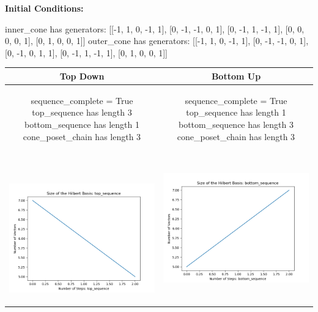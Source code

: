 \documentclass[10pt]{article}
\begin{document}
\textbf{Initial Conditions:}
\begin{SAGE}
inner_cone has generators: 
[[-1, 1, 0, -1, 1], [0, -1, -1, 0, 1], [0, -1, 1, -1, 1], [0, 0, 0, 0, 1], [0, 1, 0, 0, 1]]
outer_cone has generators: 
[[-1, 1, 0, -1, 1], [0, -1, -1, 0, 1], [0, -1, 0, 1, 1], [0, -1, 1, -1, 1], [0, 1, 0, 0, 1]]

\end{SAGE}
\begin{tabular}{c|c}
\textbf{Top Down} & \textbf{Bottom Up} \\ \hline  
\begin{SAGE}
	sequence_complete = True
	top_sequence has length 3
	bottom_sequence has length 1
	cone_poset_chain has length 3
\end{SAGE} 
&
\begin{SAGE}
	sequence_complete = True
	top_sequence has length 1
	bottom_sequence has length 3
	cone_poset_chain has length 3
\end{SAGE} 
\\ \hline
\
\begin{minipage}{.45\textwidth}
\includegraphics[width=\textwidth]{"DATA/5d/5 generators 1 bound E/top_sequence SIZE"}
\end{minipage} &
\begin{minipage}{.45\textwidth}
\includegraphics[width=\textwidth]{"DATA/5d/5 generators 1 bound E bottomup/bottom_sequence SIZE"}

\end{minipage}
\end{tabular}
\end{document}
